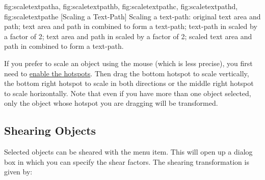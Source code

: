 {
 {fig:scaletextpatha}{}{},
 {fig:scaletextpathb}{}{},
 {fig:scaletextpathc}{}{},
 {fig:scaletextpathd}{}{},
 {fig:scaletextpathe}{}{}
}
[Scaling a Text-Path]
{Scaling a text-path:
 original text area and path;
 text area and path in
 combined to form a text-path;
 text-path 
in  scaled by a factor of 2;
 text area and path 
in  scaled by a factor of 2;
 scaled text area and path 
in  combined to form a text-path.}

If you prefer to scale an \gls{object} using the mouse (which is
less precise), you first need to \hyperref[mi:hotspots]{enable the
hotspots}. Then drag the bottom  hotspot to scale
vertically, the bottom right hotspot to scale in both directions or
the middle right hotspot to scale horizontally. Note that even if
you have more than one object selected, only the object whose
hotspot you are dragging will be transformed.




\subsection{Shearing Objects}\label{sec:shearobjects}


Selected \glspl{object} can be sheared with
the  menu item. This will open up a dialog box
in which you can specify the shear factors. The shearing
transformation is given by:
\TeXParserLibToImage
[div=displaymath,alt={
 (
   [ 1 , sX ]
   [ sY , 1 ]
 )
 (
   [ x ]
   [ y ]
 )
=
 (
   [ x + sX \texttimes\ y ]
   [ y + sY \texttimes\ x ]
 )
}]
{
\[
  \left(
  \begin{array}{cc}
  1 & s_x\\
  s_y & 1
  \end{array}
  \right)
  \left(
  \begin{array}{c}
  x\\
  y
  \end{array}
  \right)
  =
  \left(
  \begin{array}{l}
  x + s_x y\\
  y + s_y x
  \end{array}
  \right)
  \]
}

